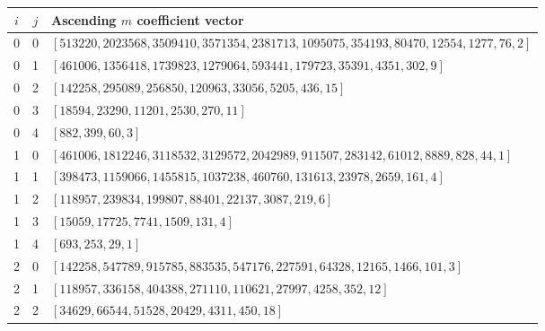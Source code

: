 \begingroup
\scriptsize
\setlength{\tabcolsep}{4pt}
\noindent\begin{tabular}{ccp{13.6cm}}
\toprule
$i$ & $j$ & Ascending $m$ coefficient vector\\
\midrule
0 & 0 & $[513220,\allowbreak 2023568,\allowbreak 3509410,\allowbreak 3571354,\allowbreak 2381713,\allowbreak 1095075,\allowbreak 354193,\allowbreak 80470,\allowbreak 12554,\allowbreak 1277,\allowbreak 76,\allowbreak 2]$\\
0 & 1 & $[461006,\allowbreak 1356418,\allowbreak 1739823,\allowbreak 1279064,\allowbreak 593441,\allowbreak 179723,\allowbreak 35391,\allowbreak 4351,\allowbreak 302,\allowbreak 9]$\\
0 & 2 & $[142258,\allowbreak 295089,\allowbreak 256850,\allowbreak 120963,\allowbreak 33056,\allowbreak 5205,\allowbreak 436,\allowbreak 15]$\\
0 & 3 & $[18594,\allowbreak 23290,\allowbreak 11201,\allowbreak 2530,\allowbreak 270,\allowbreak 11]$\\
0 & 4 & $[882,\allowbreak 399,\allowbreak 60,\allowbreak 3]$\\
1 & 0 & $[461006,\allowbreak 1812246,\allowbreak 3118532,\allowbreak 3129572,\allowbreak 2042989,\allowbreak 911507,\allowbreak 283142,\allowbreak 61012,\allowbreak 8889,\allowbreak 828,\allowbreak 44,\allowbreak 1]$\\
1 & 1 & $[398473,\allowbreak 1159066,\allowbreak 1455815,\allowbreak 1037238,\allowbreak 460760,\allowbreak 131613,\allowbreak 23978,\allowbreak 2659,\allowbreak 161,\allowbreak 4]$\\
1 & 2 & $[118957,\allowbreak 239834,\allowbreak 199807,\allowbreak 88401,\allowbreak 22137,\allowbreak 3087,\allowbreak 219,\allowbreak 6]$\\
1 & 3 & $[15059,\allowbreak 17725,\allowbreak 7741,\allowbreak 1509,\allowbreak 131,\allowbreak 4]$\\
1 & 4 & $[693,\allowbreak 253,\allowbreak 29,\allowbreak 1]$\\
2 & 0 & $[142258,\allowbreak 547789,\allowbreak 915785,\allowbreak 883535,\allowbreak 547176,\allowbreak 227591,\allowbreak 64328,\allowbreak 12165,\allowbreak 1466,\allowbreak 101,\allowbreak 3]$\\
2 & 1 & $[118957,\allowbreak 336158,\allowbreak 404388,\allowbreak 271110,\allowbreak 110621,\allowbreak 27997,\allowbreak 4258,\allowbreak 352,\allowbreak 12]$\\
2 & 2 & $[34629,\allowbreak 66544,\allowbreak 51528,\allowbreak 20429,\allowbreak 4311,\allowbreak 450,\allowbreak 18]$\\

\end{tabular}
